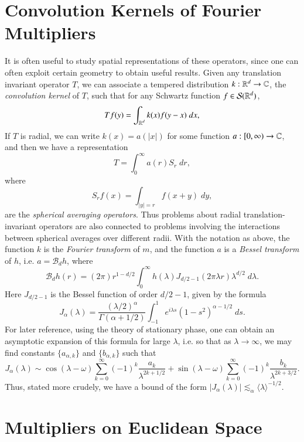 \section{Convolution Kernels of Fourier Multipliers}

It is often useful to study spatial representations of these operators, since one can often exploit certain geometry to obtain useful results. Given any translation invariant operator $T$, we can associate a tempered distribution $k: \operatorname{\mathbb{R}}^d \to \operatorname{\mathbb{C}}$, the \emph{convolution kernel} of $T$, such that for any Schwartz function $f \in \mathcal{S}(\operatorname{\mathbb{R}}^d)$,
%
\[ Tf(y) = \int_{\operatorname{\mathbb{R}}^d} k(x) f(y-x)\; dx, \]
%
If $T$ is radial, we can write $k(x) = a(|x|)$ for some function $a: [0,\infty) \to \operatorname{\mathbb{C}}$, and then we have a representation
%
\[ T = \int_0^\infty a(r) S_r\; dr, \]
%
where
%
\[ S_rf(x) = \int_{|y| = r} f(x + y)\; dy, \]
%
are the \emph{spherical averaging operators}. Thus problems about radial translation-invariant operators are also connected to problems involving the interactions between spherical averages over different radii. With the notation as above, the function $k$ is the \emph{Fourier transform} of $m$, and the function $a$ is a \emph{Bessel transform} of $h$, i.e. $a = \mathcal{B}_d h$, where
%
\[ \mathcal{B}_d h(r) = (2 \pi) r^{1-d/2} \int_0^\infty h(\lambda) J_{d/2 - 1}(2 \pi \lambda r) \lambda^{d/2}\; d\lambda. \]
%
Here $J_{d/2-1}$ is the Bessel function of order $d/2 - 1$, given by the formula
%
\[ J_\alpha(\lambda) = \frac{(\lambda / 2)^\alpha}{\Gamma(\alpha + 1/2)} \int_{-1}^1 e^{i \lambda s} (1 - s^2)^{\alpha - 1/2}\; ds. \]
%
For later reference, using the theory of stationary phase, one can obtain an asymptotic expansion of this formula for large $\lambda$, i.e. so that as $\lambda \to \infty$, we may find constants $\{ a_{\alpha,k} \}$ and $\{ b_{\alpha,k} \}$ such that
%
\[ J_\alpha(\lambda) \sim \cos(\lambda - \omega) \sum_{k = 0}^\infty (-1)^k \frac{a_k}{\lambda^{2k+1/2}} + \sin(\lambda - \omega) \sum_{k = 0}^\infty (-1)^k \frac{b_k}{\lambda^{2k + 3/2}}. \]
%
Thus, stated more crudely, we have a bound of the form $|J_\alpha(\lambda)| \lesssim_\alpha \langle \lambda \rangle^{-1/2}$.

\section{Multipliers on Euclidean Space}

